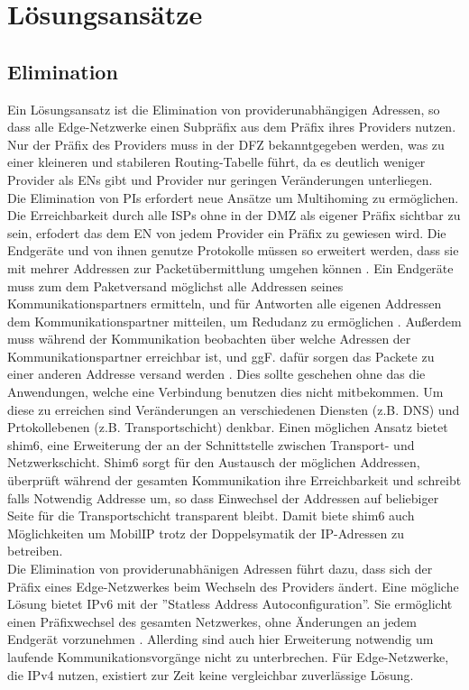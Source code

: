 \section{Lösungsansätze}
\subsection{Elimination}
Ein Lösungsansatz ist die Elimination von providerunabhängigen Adressen, so dass alle Edge-Netzwerke einen Subpräfix aus dem Präfix ihres Providers nutzen. Nur der Präfix des Providers muss in der DFZ bekanntgegeben werden, was zu einer kleineren und stabileren Routing-Tabelle führt, da es deutlich weniger Provider als ENs gibt und Provider nur geringen Veränderungen unterliegen.\\

Die Elimination von PIs erfordert neue Ansätze um Multihoming zu ermöglichen. Die Erreichbarkeit durch alle ISPs ohne in der DMZ als eigener Präfix sichtbar zu sein, erfodert das dem EN von jedem Provider ein Präfix zu gewiesen wird. Die Endgeräte und von ihnen genutze Protokolle müssen so erweitert werden, dass sie mit mehrer Addressen zur Packetübermittlung umgehen können \cite{jen:2008:start}. Ein Endgeräte muss zum dem Paketversand möglichst alle Addressen seines Kommunikationspartners ermitteln, und für Antworten alle eigenen Addressen dem Kommunikationspartner mitteilen, um Redudanz zu ermöglichen \cite{jen:2008:start}. Außerdem muss während der Kommunikation beobachten über welche Adressen der Kommunikationspartner erreichbar ist, und ggF. dafür sorgen das Packete zu einer anderen Addresse versand werden \cite{jen:2008:start}. Dies sollte geschehen ohne das die Anwendungen, welche eine Verbindung benutzen dies nicht mitbekommen. Um diese zu erreichen sind Veränderungen an verschiedenen Diensten (z.B. DNS) und Prtokollebenen (z.B. Transportschicht) denkbar. Einen möglichen Ansatz bietet shim6\cite{nordmark:2009:RFC5533}, eine Erweiterung der an der Schnittstelle zwischen Transport- und Netzwerkschicht. Shim6 sorgt für den Austausch der möglichen Addressen, überprüft während der gesamten Kommunikation ihre Erreichbarkeit und schreibt falls Notwendig Addresse um, so dass Einwechsel der Addressen auf beliebiger Seite für die Transportschicht transparent bleibt. Damit biete shim6 auch Möglichkeiten um MobilIP trotz der Doppelsymatik der IP-Adressen zu betreiben. \\
 

Die Elimination von providerunabhänigen Adressen führt dazu, dass sich der Präfix eines Edge-Netzwerkes beim Wechseln des Providers ändert. Eine mögliche Lösung bietet IPv6 mit der ''Statless Address Autoconfiguration''. Sie ermöglicht einen Präfixwechsel des gesamten Netzwerkes, ohne Änderungen an jedem Endgerät vorzunehmen \cite{RFC4862}. Allerding sind auch hier Erweiterung notwendig um laufende Kommunikationsvorgänge nicht zu unterbrechen. Für Edge-Netzwerke, die IPv4 nutzen, existiert zur Zeit keine vergleichbar zuverlässige Lösung.\\

